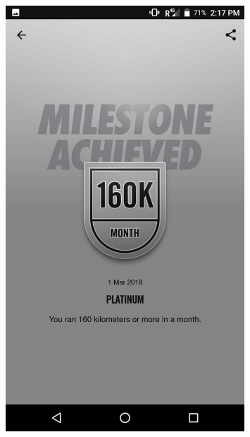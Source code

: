 \documentclass[]{article}
\begin{document}
\begin{figure}

	\includegraphics[width=0.8\textwidth]{running/160}
\end{figure}
\end{document}
